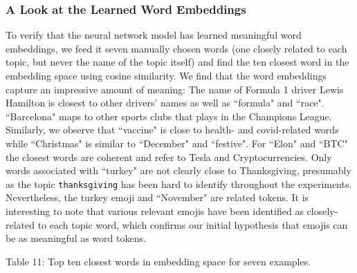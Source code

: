 \documentclass[11pt]{article}
\begin{document}
\subsubsection{A Look at the Learned Word Embeddings}
To verify that the neural network model has learned meaningful word embeddings, we feed it seven manually chosen words (one closely related to each topic, but never the name of the topic itself) and find the ten closest word in the embedding space using cosine similarity. We find that the word embeddings capture an impressive amount of meaning: The name of Formula 1 driver Lewis Hamilton is closest to other drivers' names as well as ``formula" and ``race". ``Barcelona" maps to other sports clubs that plays in the Champions League. Similarly,  we observe that ``vaccine" is close to health- and covid-related words while ``Christmas" is similar to ``December" and ``festive". For ``Elon" and ``BTC" the closest words are coherent and refer to Tesla and Cryptocurrencies. Only words associated with ``turkey" are not clearly close to Thanksgiving, presumably as the topic \texttt{thanksgiving} has been hard to identify throughout the experiments. Nevertheless, the turkey emoji and ``November" are related tokens. It is interesting to note that various relevant emojis have been identified as closely-related to each topic word, which confirms our initial hypothesis that emojis can be as meaningful as word tokens.
\\

\begin{adjustbox}{width=\columnwidth,center}

\end{adjustbox}
\begin{center}
	Table 11: Top ten closest words in embedding space for seven examples.
\end{center}

\end{document}
